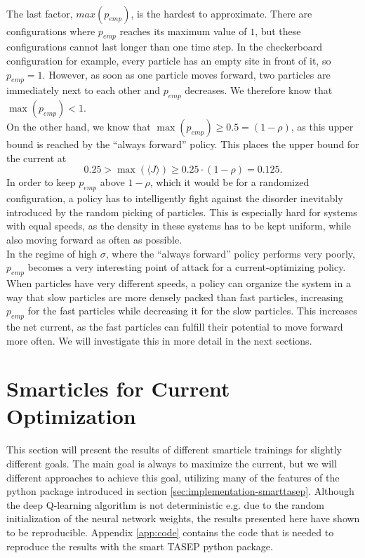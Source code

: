 \\
The last factor, $max(p_{emp})$, is the hardest to approximate. There are configurations where $p_{emp}$ reaches its maximum value of $1$, but these configurations cannot last longer than one time step. In the checkerboard configuration for example, every particle has an empty site in front of it, so $p_{emp}=1$. However, as soon as one particle moves forward, two particles are immediately next to each other and $p_{emp}$ decreases. We therefore know that $\max(p_{emp})<1$.
\\
On the other hand, we know that $\max(p_{emp})\ge0.5=(1-\rho)$, as this upper bound is reached by the \enquote{always forward} policy. This places the upper bound for the current at
\begin{equation}
    0.25 > \max(\langle J\rangle) \ge 0.25 \cdot (1-\rho) = 0.125 \text{.}
\end{equation}
In order to keep $p_{emp}$ above $1-\rho$, which it would be for a randomized configuration, a policy has to intelligently fight against the disorder inevitably introduced by the random picking of particles. This is especially hard for systems with equal speeds, as the density in these systems has to be kept uniform, while also moving forward as often as possible.
\\
In the regime of high $\sigma$, where the \enquote{always forward} policy performs very poorly, $p_{emp}$ becomes a very interesting point of attack for a current-optimizing policy. When particles have very different speeds, a policy can organize the system in a way that slow particles are more densely packed than fast particles, increasing $p_{emp}$ for the fast particles while decreasing it for the slow particles. This increases the net current, as the fast particles can fulfill their potential to move forward more often. We will investigate this in more detail in the next sections.


\section{Smarticles for Current Optimization}
\label{sec:smarticle_current_optimization}
This section will present the results of different smarticle trainings for slightly different goals. The main goal is always to maximize the current, but we will different approaches to achieve this goal, utilizing many of the features of the python package introduced in section \ref{sec:implementation-smarttasep}. Although the deep Q-learning algorithm is not deterministic e.g. due to the random initialization of the neural network weights, the results presented here have shown to be reproducible. Appendix \ref{app:code} contains the code that is needed to reproduce the results with the smart TASEP python package.

